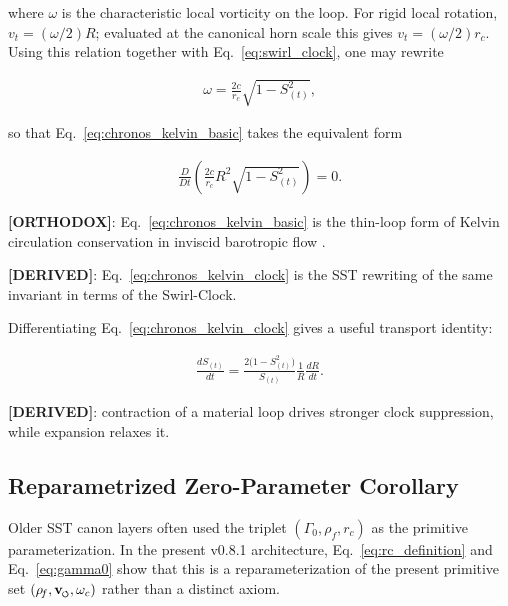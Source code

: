 \documentclass[11pt]{article}
\theoremstyle{definition}
\theoremstyle{plain}
\theoremstyle{remark}
\newcommand{\swirlarrow}{\mathchoice{\mkern-2mu\scriptstyle\boldsymbol{\circlearrowleft}}{\mkern-2mu\scriptstyle\boldsymbol{\circlearrowleft}}{\mkern-2mu\scriptscriptstyle\boldsymbol{\circlearrowleft}}{\mkern-2mu\scriptscriptstyle\boldsymbol{\circlearrowleft}}}
\newcommand{\vswirl}{\mathbf{v}_{\swirlarrow}}
\newcommand{\rhoF}{{\rho_{\!f}}}
\newcommand{\rc}{{r_c}}
\begin{document}
        where $\omega$ is the characteristic local vorticity on the loop. For rigid local rotation, $v_t=(\omega/2)R$; evaluated at the canonical horn scale this gives $v_t=(\omega/2)\rc$. Using this relation together with Eq.~\eqref{eq:swirl_clock}, one may rewrite

        \begin{align}
            \omega = \frac{2c}{\rc}\sqrt{1-S_{(t)}^2},
        \end{align}

        so that Eq.~\eqref{eq:chronos_kelvin_basic} takes the equivalent form

        \begin{align}
            \frac{D}{Dt}\left(\frac{2c}{\rc} R^2 \sqrt{1-S_{(t)}^2}\right) = 0.
            \label{eq:chronos_kelvin_clock}
        \end{align}

        \textbf{[ORTHODOX]}: Eq.~\eqref{eq:chronos_kelvin_basic} is the thin-loop form of Kelvin circulation conservation in inviscid barotropic flow \cite{Batchelor1967,Saffman1992}.

        \textbf{[DERIVED]}: Eq.~\eqref{eq:chronos_kelvin_clock} is the SST rewriting of the same invariant in terms of the Swirl-Clock.

        Differentiating Eq.~\eqref{eq:chronos_kelvin_clock} gives a useful transport identity:

        \begin{align}
            \frac{dS_{(t)}}{dt}
            =
            \frac{2\bigl(1-S_{(t)}^2\bigr)}{S_{(t)}}
            \frac{1}{R}\frac{dR}{dt}.
            \label{eq:clock_radius_transport}
        \end{align}

        \textbf{[DERIVED]}: contraction of a material loop drives stronger clock suppression, while expansion relaxes it.

    \subsection{Reparametrized Zero-Parameter Corollary}
        \label{subsec:zero_parameter_corollary}

        Older SST canon layers often used the triplet $(\Gamma_0,\rhoF,\rc)$ as the primitive parameterization. In the present v0.8.1 architecture, Eq.~\eqref{eq:rc_definition} and Eq.~\eqref{eq:gamma0} show that this is a reparameterization of the present primitive set $(\rhoF,\vswirl,\omega_c)$ rather than a distinct axiom.
\end{document}
